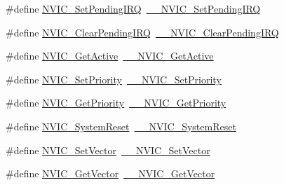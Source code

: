 \begin{DoxyCompactItemize}
\item 
\#define \hyperlink{group___c_m_s_i_s___core___n_v_i_c_functions_ga2b47e2e52cf5c48a5c3348636434b3ac}{N\+V\+I\+C\+\_\+\+Set\+Pending\+I\+RQ}~\hyperlink{group___c_m_s_i_s___core___n_v_i_c_functions_gaabefdd4b790b9a7308929938c0c1e1ad}{\+\_\+\+\_\+\+N\+V\+I\+C\+\_\+\+Set\+Pending\+I\+RQ}
\item 
\#define \hyperlink{group___c_m_s_i_s___core___n_v_i_c_functions_ga590cf113000a079b1f0ea3dcd5b5316c}{N\+V\+I\+C\+\_\+\+Clear\+Pending\+I\+RQ}~\hyperlink{group___c_m_s_i_s___core___n_v_i_c_functions_ga562a86dbdf14827d0fee8fdafb04d191}{\+\_\+\+\_\+\+N\+V\+I\+C\+\_\+\+Clear\+Pending\+I\+RQ}
\item 
\#define \hyperlink{group___c_m_s_i_s___core___n_v_i_c_functions_ga58ad3f352f832235ab3b192ff4745320}{N\+V\+I\+C\+\_\+\+Get\+Active}~\hyperlink{group___c_m_s_i_s___core___n_v_i_c_functions_gaa2837003c28c45abf193fe5e8d27f593}{\+\_\+\+\_\+\+N\+V\+I\+C\+\_\+\+Get\+Active}
\item 
\#define \hyperlink{group___c_m_s_i_s___core___n_v_i_c_functions_gae0e9d0e2f7b6133828c71b57d4941c35}{N\+V\+I\+C\+\_\+\+Set\+Priority}~\hyperlink{group___c_m_s_i_s___core___n_v_i_c_functions_ga505338e23563a9c074910fb14e7d45fd}{\+\_\+\+\_\+\+N\+V\+I\+C\+\_\+\+Set\+Priority}
\item 
\#define \hyperlink{group___c_m_s_i_s___core___n_v_i_c_functions_gaf59b9d0a791d2157abb319753953eceb}{N\+V\+I\+C\+\_\+\+Get\+Priority}~\hyperlink{group___c_m_s_i_s___core___n_v_i_c_functions_gaeb9dc99c8e7700668813144261b0bc73}{\+\_\+\+\_\+\+N\+V\+I\+C\+\_\+\+Get\+Priority}
\item 
\#define \hyperlink{group___c_m_s_i_s___core___n_v_i_c_functions_ga6aa0367d3642575610476bf0366f0c48}{N\+V\+I\+C\+\_\+\+System\+Reset}~\hyperlink{group___c_m_s_i_s___core___n_v_i_c_functions_ga0d9aa2d30fa54b41eb780c16e35b676c}{\+\_\+\+\_\+\+N\+V\+I\+C\+\_\+\+System\+Reset}
\item 
\#define \hyperlink{group___c_m_s_i_s___core___n_v_i_c_functions_ga804af63bb4c4c317387897431814775d}{N\+V\+I\+C\+\_\+\+Set\+Vector}~\hyperlink{group___c_m_s_i_s___core___n_v_i_c_functions_ga0df355460bc1783d58f9d72ee4884208}{\+\_\+\+\_\+\+N\+V\+I\+C\+\_\+\+Set\+Vector}
\item 
\#define \hyperlink{group___c_m_s_i_s___core___n_v_i_c_functions_ga955eb1c33a3dcc62af11a8385e8c0fc8}{N\+V\+I\+C\+\_\+\+Get\+Vector}~\hyperlink{group___c_m_s_i_s___core___n_v_i_c_functions_ga44b665d2afb708121d9b10c76ff00ee5}{\+\_\+\+\_\+\+N\+V\+I\+C\+\_\+\+Get\+Vector}
\item 

\end{DoxyCompactItemize}
